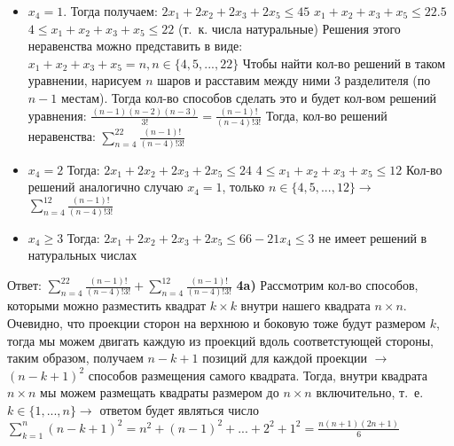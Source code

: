 \documentclass[12pt,a4paper,fleqn]{article}
\begin{document}
\begin{itemize}
\item $x_4 = 1$. Тогда получаем: \newline
$2x_1 + 2x_2 + 2x_3 + 2x_5 \leqslant 45$ \newline
$x_1 + x_2 + x_3 + x_5 \leqslant 22.5$ \newline
$4 \leqslant x_1 + x_2 + x_3 + x_5 \leqslant 22$ (т.~к. числа натуральные) \newline
Решения этого неравенства можно представить в виде: \newline
$x_1 + x_2 + x_3 + x_5 = n, n \in \{4, 5, ..., 22\}$ \newline
Чтобы найти кол-во решений в таком уравнении, нарисуем $n$ шаров и расставим между ними $3$ разделителя (по $n - 1$ местам). Тогда кол-во способов сделать это и будет кол-вом решений уравнения:
$\frac{(n - 1)(n - 2)(n - 3)}{3!} = \frac{(n - 1)!}{(n - 4)! 3!}$ \newline
Тогда, кол-во решений неравенства: \newline
$\sum_{n = 4}^{22} \frac{(n - 1)!}{(n - 4)! 3!}$
\item $x_4 = 2$ Тогда: \newline
$2x_1 + 2x_2 + 2x_3 + 2x_5 \leqslant 24$ \newline
$4 \leqslant x_1 + x_2 + x_3 + x_5 \leqslant 12$ \newline
Кол-во решений аналогично случаю $x_4 = 1$, только $n \in \{4, 5, ..., 12\} \rightarrow$ \newline
$\sum_{n = 4}^{12} \frac{(n - 1)!}{(n - 4)! 3!}$
\item $x_4 \geqslant 3$ Тогда:
$2x_1 + 2x_2 + 2x_3 + 2x_5 \leqslant 66 - 21x_4 \leqslant 3$ не имеет решений в натуральных числах
\end{itemize}
Ответ: $\sum_{n = 4}^{22} \frac{(n - 1)!}{(n - 4)! 3!} + \sum_{n = 4}^{12} \frac{(n - 1)!}{(n - 4)! 3!}$ \newline \newline
{\bf 4a)} Рассмотрим кол-во способов, которыми можно разместить квадрат $k\times k$ внутри нашего квадрата $n\times n$. Очевидно, что проекции сторон на верхнюю и боковую тоже будут размером $k$, тогда мы можем двигать каждую из проекций вдоль соответстующей стороны, таким образом, получаем $n - k + 1$ позиций для каждой проекции $\rightarrow$ $(n - k + 1)^2$  способов размещения самого квадрата. Тогда, внутри квадрата $n \times n$ мы можем размещать квадраты размером до $n \times n$ включительно, т.~е. $k \in \{1,..., n\} \rightarrow$ ответом будет являться число $\sum_{k = 1}^n (n - k + 1)^2 = n^2 + (n - 1)^2 + ... + 2^2 + 1^2 = \frac{n(n + 1)(2n + 1)}{6}$ \newline
\end{document}
